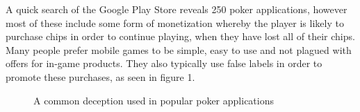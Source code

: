 \documentclass[11pt]{article}
\begin{document}
{A quick search of the Google Play Store reveals 250 poker applications, however most of these include some form of monetization whereby the player is likely to purchase chips in order to continue playing, when they have lost all of their chips. Many people prefer mobile games to be simple, easy to use and not plagued with offers for in-game products. They also typically use false labels in order to promote these purchases, as seen in figure 1.


\begin{center}

\begin{figure}[h]
	
	\caption{A common deception used in popular poker applications}
	
\end{figure}
	

\end{center}}
\end{document}

